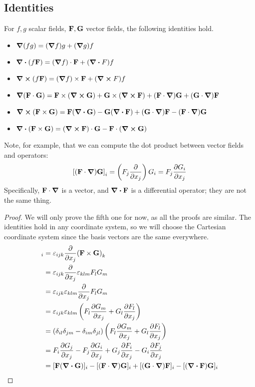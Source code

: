 \documentclass{article}
\begin{document}
\subsection{Identities}
\begin{proposition}
	For $f, g$ scalar fields, $\vb F, \vb G$ vector fields, the following identities hold.
	\begin{itemize}
		\item $\grad(fg) = (\grad f)g + (\grad g)f$
		\item $\div(f \vb F) = (\grad f)\cdot \vb F + (\div F)f$
		\item $\curl(f \vb F) = (\grad f)\times \vb F + (\curl F)f$
		\item $\grad(\vb F \cdot \vb G) = \vb F \times (\curl{\vb G}) + \vb G \times (\curl{\vb F}) + (\vb F \cdot \grad)\vb G + (\vb G \cdot \grad)\vb F$
		\item $\curl(\vb F \times \vb G) = \vb F(\div{\vb G}) - \vb G(\div{\vb F}) + (\vb G \cdot \grad)\vb F - (\vb F \cdot \grad)\vb G$
		\item $\div(\vb F \times \vb G) = (\curl{\vb F}) \cdot \vb G - \vb F \cdot (\curl{\vb G})$
	\end{itemize}
\end{proposition}
\noindent Note, for example, that we can compute the dot product between vector fields and operators:
\[ \left[ (\vb F \cdot \grad) \vb G \right]_i = \left( F_j \pdv{x_j} \right) G_i = F_j \pdv{G_i}{x_j} \]
Specifically, $\vb F \cdot \grad$ is a vector, and $\div{\vb F}$ is a differential operator; they are not the same thing.
\begin{proof}
	We will only prove the fifth one for now, as all the proofs are similar. The identities hold in any coordinate system, so we will choose the Cartesian coordinate system since the basis vectors are the same everywhere.
	\begin{align*}
		[\curl(\vb F \times \vb G)]_i & = \varepsilon_{ijk} \pdv{x_j} (\vb F \times \vb G)_k                                                            \\
		                              & = \varepsilon_{ijk} \pdv{x_j} \varepsilon_{klm} F_l G_m                                                         \\
		                              & = \varepsilon_{ijk} \varepsilon_{klm} \pdv{x_j} F_l G_m                                                         \\
		                              & = \varepsilon_{ijk} \varepsilon_{klm} \left( F_l \pdv{G_m}{x_j} + G_l \pdv{F_l}{x_j}  \right)                   \\
		                              & = (\delta_{il}\delta_{jm} - \delta_{im}\delta_{jl}) \left( F_l \pdv{G_m}{x_j} + G_l \pdv{F_l}{x_j} \right)      \\
		                              & = F_i \pdv{G_j}{x_j} - F_j \pdv{G_i}{x_j} + G_j \pdv{F_i}{x_j} - G_i \pdv{F_j}{x_j}                             \\
		                              & = [\vb F(\div{\vb G})]_i - [(\vb F \cdot \grad)\vb G]_i + [(\vb G \cdot \grad)\vb F]_i - [(\div{\vb F})\vb G]_i
	\end{align*}
\end{proof}
\end{document}
